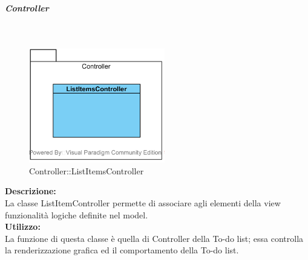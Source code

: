\subparagraph{Controller}\mbox{}
\begin{samepage}
	\label{todo-controller}\mbox{}\\
	\nopagebreak
	\begin{figure}[H]
		\centering
		\includegraphics[height=5cm]{diagrammi_img/classi_e_package/todo_controller}
		\caption{Controller\-::ListItemsController}
	\end{figure}
\end{samepage}
\textbf{Descrizione:}\\
La classe ListItemController permette di associare agli elementi della view funzionalità logiche definite nel model.\\
\textbf{Utilizzo:}\\
La funzione di questa classe è quella di Controller della To-do list; essa controlla la renderizzazione grafica ed il comportamento della To-do list.\\
